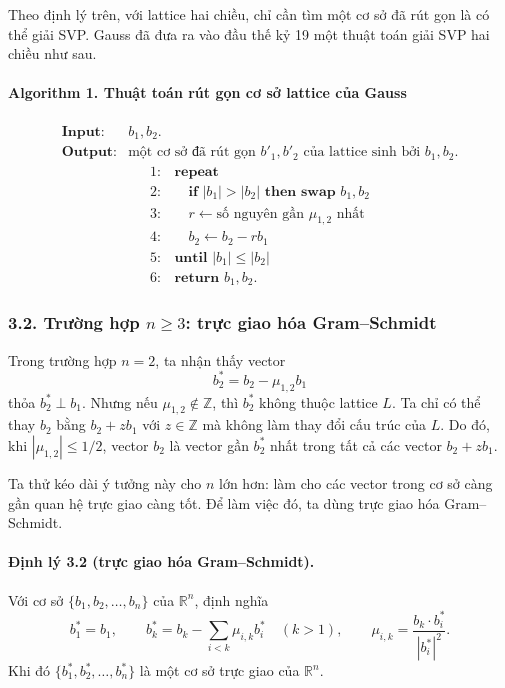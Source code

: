 \documentclass[11pt]{article}
\begin{document}
Theo định lý trên, với lattice hai chiều, chỉ cần tìm một cơ sở đã rút gọn là
có thể giải SVP. Gauss đã đưa ra vào đầu thế kỷ 19 một thuật toán giải SVP hai
chiều như sau.

\paragraph{Algorithm 1. Thuật toán rút gọn cơ sở lattice của Gauss}
\[
\begin{array}{ll}
\textbf{Input:} & b_1,b_2.\\
\textbf{Output:} & \text{một cơ sở đã rút gọn } b'_1,b'_2 \text{ của lattice sinh bởi } b_1,b_2.
\end{array}
\]
\[
\begin{array}{rl}
1:& \textbf{repeat}\\
2:& \quad \textbf{if } |b_1|>|b_2| \textbf{ then swap } b_1,b_2\\
3:& \quad r\leftarrow \text{số nguyên gần } \mu_{1,2} \text{ nhất}\\
4:& \quad b_2\leftarrow b_2-rb_1\\
5:& \textbf{until } |b_1|\le |b_2|\\
6:& \textbf{return } b_1,b_2.
\end{array}
\]

\subsubsection*{3.2. Trường hợp \(n\ge3\): trực giao hóa Gram--Schmidt}

Trong trường hợp \(n=2\), ta nhận thấy vector
\[
  b_2^*=b_2-\mu_{1,2}b_1
\]
thỏa \(b_2^*\perp b_1\). Nhưng nếu \(\mu_{1,2}\notin\mathbb Z\), thì \(b_2^*\)
không thuộc lattice \(L\). Ta chỉ có thể thay \(b_2\) bằng \(b_2+zb_1\) với
\(z\in\mathbb Z\) mà không làm thay đổi cấu trúc của \(L\). Do đó, khi
\(|\mu_{1,2}|\le1/2\), vector \(b_2\) là vector gần \(b_2^*\) nhất trong tất cả
các vector \(b_2+zb_1\).

Ta thử kéo dài ý tưởng này cho \(n\) lớn hơn: làm cho các vector trong cơ sở
càng gần quan hệ trực giao càng tốt. Để làm việc đó, ta dùng trực giao hóa
Gram--Schmidt.

\paragraph{Định lý 3.2 (trực giao hóa Gram--Schmidt).}
Với cơ sở \(\{b_1,b_2,\ldots,b_n\}\) của \(\mathbb R^n\), định nghĩa
\[
  b_1^*=b_1,\qquad
  b_k^*=b_k-\sum_{i<k}\mu_{i,k}b_i^*
  \quad (k>1),\qquad
  \mu_{i,k}=\frac{b_k\cdot b_i^*}{|b_i^*|^2}.
\]
Khi đó \(\{b_1^*,b_2^*,\ldots,b_n^*\}\) là một cơ sở trực giao của
\(\mathbb R^n\).
\end{document}
